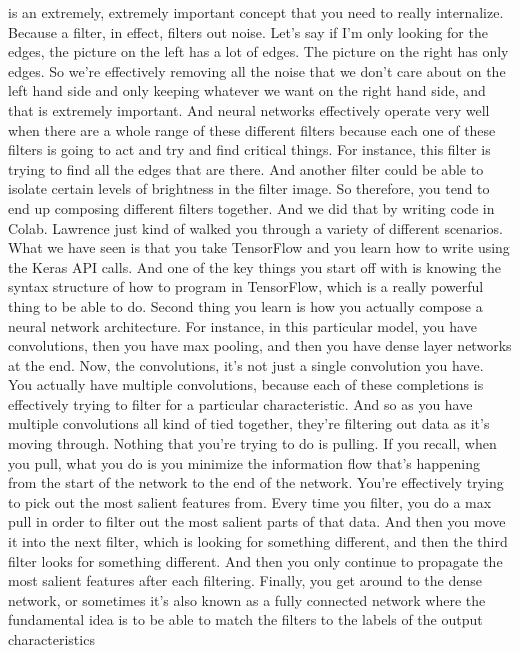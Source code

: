 is an extremely, extremely important concept
that you need to really internalize.
Because a filter, in effect, filters out noise.
Let's say if I'm only looking for the edges, the picture on the left
has a lot of edges.
The picture on the right has only edges.
So we're effectively removing all the noise
that we don't care about on the left hand side
and only keeping whatever we want on the right hand side,
and that is extremely important.
And neural networks effectively operate very well
when there are a whole range of these different filters
because each one of these filters is going to act and try and find
critical things.
For instance, this filter is trying to find all the edges that are there.
And another filter could be able to isolate certain levels of brightness
in the filter image.
So therefore, you tend to end up composing different filters together.
And we did that by writing code in Colab.
Lawrence just kind of walked you through a variety of different scenarios.
What we have seen is that you take TensorFlow and you learn
how to write using the Keras API calls.
And one of the key things you start off with
is knowing the syntax structure of how to program
in TensorFlow, which is a really powerful thing to be able to do.
Second thing you learn is how you actually
compose a neural network architecture.
For instance, in this particular model, you have convolutions,
then you have max pooling, and then you have dense layer networks at the end.
Now, the convolutions, it's not just a single convolution you have.
You actually have multiple convolutions, because each of these completions
is effectively trying to filter for a particular characteristic.
And so as you have multiple convolutions all kind of tied together,
they're filtering out data as it's moving through.
Nothing that you're trying to do is pulling.
If you recall, when you pull, what you do is you
minimize the information flow that's happening from the start of the network
to the end of the network.
You're effectively trying to pick out the most salient features from.
Every time you filter, you do a max pull in order to filter out
the most salient parts of that data.
And then you move it into the next filter, which
is looking for something different, and then the third filter
looks for something different.
And then you only continue to propagate the most salient features
after each filtering.
Finally, you get around to the dense network,
or sometimes it's also known as a fully connected network where
the fundamental idea is to be able to match
the filters to the labels of the output characteristics

